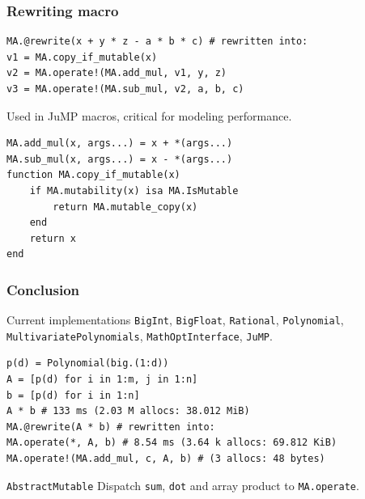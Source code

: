 \documentclass{beamer}
\begin{document}
\begin{frame}[fragile]
  \frametitle{Rewriting macro}
  \begin{verbatim}
MA.@rewrite(x + y * z - a * b * c) # rewritten into:
v1 = MA.copy_if_mutable(x)
v2 = MA.operate!(MA.add_mul, v1, y, z)
v3 = MA.operate!(MA.sub_mul, v2, a, b, c)
  \end{verbatim}
  Used in JuMP macros, critical for modeling performance.
  \begin{verbatim}
MA.add_mul(x, args...) = x + *(args...)
MA.sub_mul(x, args...) = x - *(args...)
function MA.copy_if_mutable(x)
    if MA.mutability(x) isa MA.IsMutable
        return MA.mutable_copy(x)
    end
    return x
end
  \end{verbatim}
\end{frame}

\begin{frame}[fragile]
  \frametitle{Conclusion}
  \begin{block}{Current implementations}
  \texttt{BigInt}, \texttt{BigFloat}, \texttt{Rational},
  \texttt{Polynomial}, \texttt{MultivariatePolynomials},
  \texttt{MathOptInterface}, \texttt{JuMP}.
  \end{block}
  \begin{verbatim}
p(d) = Polynomial(big.(1:d))
A = [p(d) for i in 1:m, j in 1:n]
b = [p(d) for i in 1:n]
A * b # 133 ms (2.03 M allocs: 38.012 MiB)
MA.@rewrite(A * b) # rewritten into:
MA.operate(*, A, b) # 8.54 ms (3.64 k allocs: 69.812 KiB)
MA.operate!(MA.add_mul, c, A, b) # (3 allocs: 48 bytes)
  \end{verbatim}
  \begin{block}{\texttt{AbstractMutable}}
    Dispatch \texttt{sum}, \texttt{dot} and array product to \texttt{MA.operate}.
  \end{block}
\end{frame}
\end{document}
